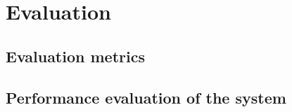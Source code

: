 \chapter{Evaluation}
\label{cha:evaluation}
\section{Evaluation metrics}
\section{Performance evaluation of the system}